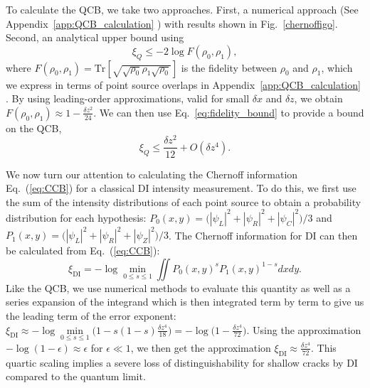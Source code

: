 \documentclass[reprint,amsmath,amssymb,aps,prl,floatfix,groupedaddress,superscriptaddress]{revtex4-2}
\begin{document}
To calculate the QCB, we take two approaches. First, a numerical approach (See Appendix~\ref{app:QCB_calculation} \cite{supposta}) with  results shown in Fig.~\ref{chernoffigo}. Second, an analytical upper bound using \cite{calsamiglia2008quantum,lupo2020quantum}
\begin{equation} \label{eq:fidelity_bound}
    \xi_Q \leq - 2 \log F(\rho_0, \rho_1),
\end{equation}
where $F(\rho_0, \rho_1) = \text{Tr}\left[ \sqrt{\sqrt{\rho_0} \rho_1 \sqrt{\rho_0}}\right]$ is the fidelity between $\rho_0$ and $\rho_1$, which we express in terms of point source overlaps in Appendix~\ref{app:QCB_calculation} \cite{supposta}. By using leading-order approximations, valid for small $\delta x$ and $\delta z$, we obtain $F(\rho_0,\rho_1) \approx 1 - \frac{\delta z^2}{24}$. We can then use Eq.~\eqref{eq:fidelity_bound} to provide a bound on the QCB,
\begin{equation}
    \xi_Q \leq \frac{\delta z^2}{12} + O(\delta z^4).
\end{equation}

We now %
turn our attention to calculating the Chernoff information Eq.~(\ref{eq:CCB}) for a classical DI intensity measurement. To do this, we first use the sum of the intensity distributions of each point source to obtain a probability distribution for each hypothesis: $P_0(x,y) = \big({|\psi_L|^2 + |\psi_R|^2 + |\psi_C|^2}\big)/{3}$ and $P_1(x,y) = \big({|\psi_L|^2 + |\psi_R|^2 + |\psi_Z|^2}\big)/{3}$. The Chernoff information for DI can then be calculated from Eq.~(\ref{eq:CCB}):
\begin{equation}\label{eq:CI_DI}
\xi_{\textrm{DI}} = - \log \min_{0 \leq s \leq 1} \mbox{$\iint P_0(x,y)^s P_1(x,y)^{1-s} dx dy$}.
\end{equation}
Like the QCB, we use numerical methods to evaluate this quantity as well as a series expansion of the integrand which is then integrated term by term to give us the leading term of the error exponent: $\xi_{\textrm{DI}} \approx - \log \min\limits_{0 \leq s \leq 1} \big( 1 - s(1-s) \frac{\delta z^4}{18}\big) = -\log \big(1 - \frac{\delta z^4}{72} \big)$.
Using the approximation $-\log(1-\epsilon) \approx \epsilon$ for $\epsilon \ll 1$, we then get the approximation $\xi_{\textrm{DI}} \approx \frac{\delta z^4}{72}$. This quartic scaling implies a severe loss of distinguishability for shallow cracks by DI compared to the quantum limit.
\end{document}
